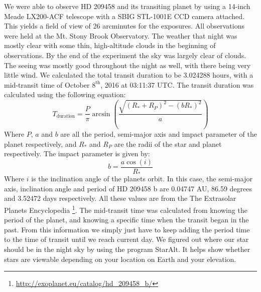 \documentclass{aastex61}
\begin{document}
We were able to observe HD 209458 and its transiting planet by using a 14-inch Meade LX200-ACF telescope with a SBIG STL-1001E CCD camera attached. This yields a field of view of 26 arcminutes for the exposures. All observations were held at the Mt. Stony Brook Observatory. The weather that night was mostly clear with some thin, high-altitude clouds in the beginning of observations. By the end of the experiment the sky was largely clear of clouds. The seeing was mostly good throughout the night as well, with there being very little wind. We calculated the total transit duration to be 3.024288 hours, with a mid-transit time of October $8^{\text{th}}$, 2016 at 03:11:37 UTC. The transit duration was calculated using the following equation:
\begin{equation}
T_{\text{duration}} = \frac{P}{\pi}\arcsin\left(\frac{\sqrt{(R_*+R_P)^{2}-(bR_*)^{2}}}{a}\right)
\end{equation}
Where $P$, $a$ and $b$ are all the period, semi-major axis and impact parameter of the planet respectively, and $R_*$ and $R_P$ are the radii of the star and planet respectively. The impact parameter is given by:
\begin{equation}
	b = \frac{a \cos(i)}{R_*}
\end{equation}
Where $i$ is the inclination angle of the planets orbit. In this case, the semi-major axis, inclination angle and period of HD 209458 b are 0.04747 AU, 86.59 degrees and 3.52472 days respectively. All these values are from the The Extrasolar
Planets Encyclopedia \footnote{\url{http://exoplanet.eu/catalog/hd_209458_b/}}. The mid-transit time was calculated from knowing the period of the planet, and knowing a specific time when the transit began in the past. From this information we simply just have to keep adding the period time to the time of transit until we reach current day. We figured out where our star should be in the night sky by using the program StarAlt. It helps show whether stars are viewable depending on your location on Earth and your elevation.
\end{document}
